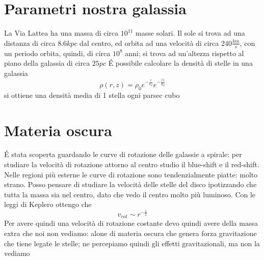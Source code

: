 \section{Parametri nostra galassia}

La Via Lattea ha una massa di circa \(10^{11}\) masse solari.
Il sole si trova ad una distanza di circa \(8.6 kpc\) dal centro, ed orbita ad una velocità di circa \(240 \frac{km}{s}\), con un periodo orbita, quindi, di circa \(10^8\) anni; 
si trova ad un'altezza rispetto al piano della galassia di circa \(25 pc\) \newline
\'E possibile calcolare la densità di stelle in una galassia 
\begin{equation*}
    \rho(r,z) = \rho_0 e^{-\frac{r}{r_d}}e^{-\frac{|z|}{h_d}}
\end{equation*}
si ottiene una densità media di 1 stella ogni parsec cubo

\section{Materia oscura}

\'E stata scoperta guardando le curve di rotazione delle galassie a spirale: per studiare la velocità di rotazione attorno al centro studio il blue-shift e il red-shift.
Nelle regioni più esterne le curve di rotazione sono tendenzialmente piatte: molto strano.
Posso pensare di studiare la velocità delle stelle del disco ipotizzando che tutta la massa sia nel centro, dato che vedo il centro molto più luminoso. 
Con le leggi di Keplero ottengo che 
\begin{equation*}
    v_{rot} \sim r^{-\frac{1}{2}}
\end{equation*}
Per avere quindi una velocità di rotazione costante devo quindi avere della massa extra che noi non vediamo: alone di materia oscura che genera forza gravitazione che tiene legate le stelle; 
ne percepiamo quindi gli effetti gravitazionali, ma non la vediamo